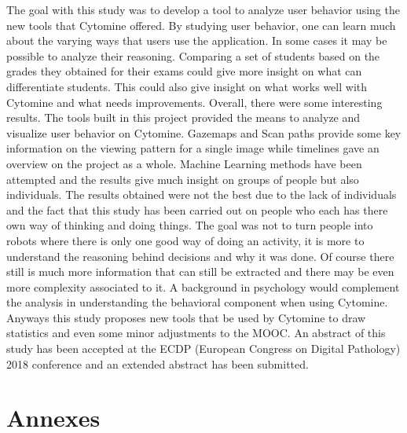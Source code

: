 \documentclass[a4paper,11pt]{report}
\numberwithin{figure}{chapter} %
\begin{document}
    The goal with this study was to develop a tool to analyze user behavior using the new tools that Cytomine offered.
    By studying user behavior, one can learn much about the varying ways that users use the application.
    In some cases it may be possible to analyze their reasoning.
    Comparing a set of students based on the grades they obtained for their exams could give more insight on what can differentiate students.
    This could also give insight on what works well with Cytomine and what needs improvements.
    Overall, there were some interesting results.
    The tools built in this project provided the means to analyze and visualize user behavior on Cytomine.
    Gazemaps and Scan paths provide some key information on the viewing pattern for a single image while timelines gave an overview on the project as a whole.
    Machine Learning methods have been attempted and the results give much insight on groups of people but also individuals.
    The results obtained were not the best due to the lack of individuals and the fact that this study has been carried out on people who each has there own way of thinking and doing things.
    The goal was not to turn people into robots where there is only one good way of doing an activity, it is more to understand the reasoning behind decisions and why it was done.
    Of course there still is much more information that can still be extracted and there may be even more complexity associated to it.
    A background in psychology would complement the analysis in understanding the behavioral component when using Cytomine.
    Anyways this study proposes new tools that be used by Cytomine to draw statistics and even some minor adjustments to the MOOC.
    An abstract of this study has been accepted at the ECDP (European Congress on Digital Pathology) 2018 conference and an extended abstract has been submitted.


{}



\chapter*{Annexes}

\begin{table}[h!]
    \caption{Source Code References}
\end{table}
\end{document}
